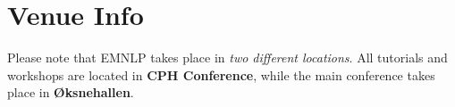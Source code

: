 \setheaders{}{}
\section{Venue Info}{}

Please note that EMNLP takes place in \textit{two different locations}. All tutorials and workshops are located in \textbf{CPH Conference}, while the main conference takes place in \textbf{Øksnehallen}. 